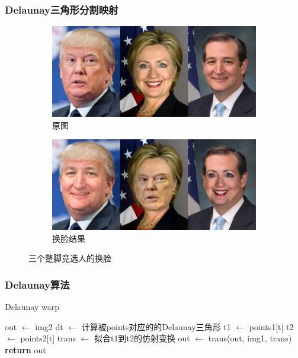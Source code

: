 \documentclass{beamer}
\begin{document}
\begin{frame}

\frametitle{Delaunay三角形分割映射}

\begin{figure}[htb]
    \centering
    \begin{subfigure}[b]{0.6\linewidth}
        \includegraphics[width=\linewidth]{presidential-original.jpg}
        \caption{原图}
      \end{subfigure}
      \begin{subfigure}[b]{0.6\linewidth}
        \includegraphics[width=\linewidth]{presidential-swap.jpg}
        \caption{换脸结果}
      \end{subfigure}
      \caption{三个蹩脚竞选人的换脸}
      \label{fig:presid}
\end{figure}

\end{frame}

\begin{frame}

    \frametitle{Delaunay算法}
    
    \begin{algorithm}[H]
        \caption{Delaunay warp}
        \begin{algorithmic}[1]
            \State out $\gets$ img2
            \State dt $\gets$ 计算被points对应的的Delaunay三角形
                \State t1 $\gets$ points1[t]
                \State t2 $\gets$ points2[t]
                \State trans $\gets$ 拟合t1到t2的仿射变换
                \State out $\gets$ trans(out, img1, trans) 
            \EndFor
            \State \textbf{return} out
        \EndProcedure
        \end{algorithmic}
        \label{alg:delwarp}
    \end{algorithm}
    
    \end{frame}
\end{document}
